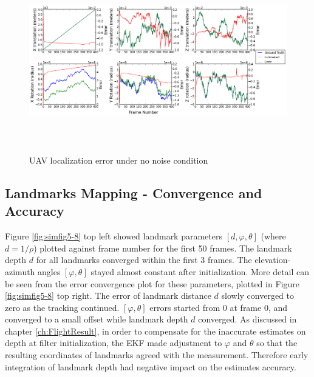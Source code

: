 \begin{figure}[h]
\centering
\includegraphics[width=16cm, height=8cm]{./Figures/SimulationFigures/Figure1.png}
\caption{UAV localization error under no noise condition}
\label{fig:simfig1}
\end{figure}
\FloatBarrier

\subsection{Landmarks Mapping - Convergence and Accuracy}
Figure \ref{fig:simfig5-8} top left showed landmark parameters $[d,
\varphi ,\theta]$ (where $d=1/\rho $) plotted against frame number for
the first 50 frames. The landmark depth $d$ for all landmarks
converged within the first 3 frames. The elevation-azimuth angles
$[\varphi ,\theta]$ stayed almost constant after initialization. More
detail can be seen from the error convergence plot for these
parameters, plotted in Figure \ref{fig:simfig5-8} top right. The error
of landmark distance $d$ slowly converged to zero as the tracking
continued. $[\varphi ,\theta]$ errors started from 0 at frame 0, and
converged to a small offset while landmark depth $d$ converged. As
discussed in chapter \ref{ch:FlightResult}, in order to compensate for
the inaccurate estimates on depth at filter initialization, the EKF
made adjustment to $\varphi$ and $\theta$ so that the resulting
coordinates of landmarks agreed with the measurement. Therefore early
integration of landmark depth had negative impact on the estimates
accuracy. 

